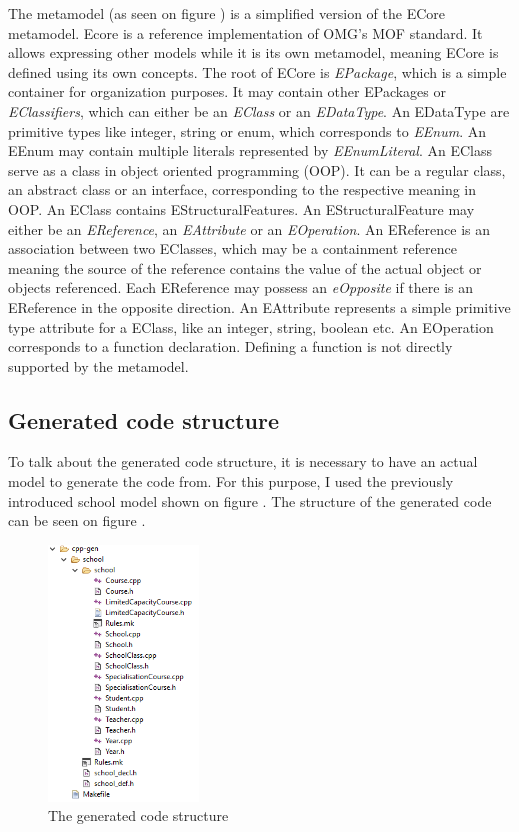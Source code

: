 The metamodel (as seen on figure ) is a simplified version of
the ECore metamodel. Ecore is a reference implementation of OMG's MOF
standard. It allows expressing other models while it is its own metamodel,
meaning ECore is defined using its own concepts. The root of ECore is
\emph{EPackage}, which is a simple container for organization purposes. It
may contain other EPackages or \emph{EClassifiers}, which can either
be an \emph{EClass} or an \emph{EDataType}. An EDataType are primitive types
like integer, string or enum, which corresponds to \emph{EEnum}. An EEnum may
contain multiple literals represented by \emph{EEnumLiteral}. An EClass serve as
a class in object oriented programming (OOP). It can be a regular class, an
abstract class or an interface, corresponding to the respective meaning in OOP.
An EClass contains EStructuralFeatures. An EStructuralFeature may either be an
\emph{EReference}, an \emph{EAttribute} or an \emph{EOperation}. An EReference
is an association between two EClasses, which may be a containment reference
meaning the source of the reference contains the value of the actual object or
objects referenced. Each EReference may possess an \emph{eOpposite} if there is
an EReference in the opposite direction. An EAttribute represents a simple
primitive type attribute for a EClass, like an integer, string, boolean etc. An
EOperation corresponds to a function declaration. Defining a function is not
directly supported by the metamodel.

\subsection{Generated code structure}\label{sect:GeneratedCodeStructure}

To talk about the generated code structure, it is necessary to have an actual
model to generate the code from. For this purpose, I used the previously
introduced school model shown on figure . The structure
of the generated code can be seen on figure .

\begin{figure}[!ht]
\centering
\includegraphics[width=40mm, keepaspectratio]{figures/gen_code_struct.png}
\caption{The generated code structure}
\label{fig:GenCodeStruct}
\end{figure}

